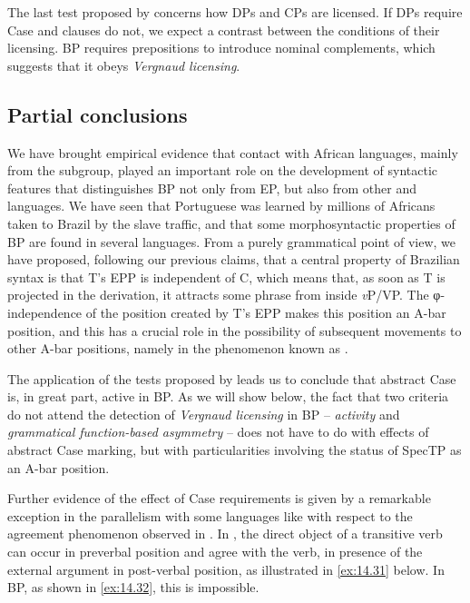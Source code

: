 \documentclass[output=paper]{langsci/langscibook}
\begin{document}
\largerpage

The last test proposed by \citeauthor{SheevanderWal2018} concerns how DPs and
CPs are licensed. If DPs require Case and clauses do not, we expect a contrast
between the conditions of their licensing. \gls{BP} requires prepositions to
introduce nominal complements, which suggests that it obeys \emph{Vergnaud
licensing}.

\subsection{Partial conclusions}\label{sec:14.4.3}\largerpage

We have brought empirical evidence that contact with African languages, mainly
from the  subgroup, played an important role on the development of
syntactic features that distinguishes \gls{BP} not
only from \gls{EP}, but also from other 
and  languages. We have seen that Portuguese was learned by
millions of Africans taken to Brazil by the slave traffic, and that some
morphosyntactic properties of \gls{BP} are found in
several  languages. From a purely grammatical point of view, we have
proposed, following our previous claims, that a central property of Brazilian
syntax is that T’s \gls{EPP} is independent
of C, which means that, as soon as T is projected in the derivation, it
attracts some phrase from inside \emph{v}P/VP. The φ-independence of the
position created by T’s \gls{EPP} makes this
position an A-bar position, and this has a crucial role in the possibility of
subsequent movements to other A-bar positions, namely in the phenomenon known
as .

The application of the tests proposed by \textcite{SheevanderWal2018} leads us
to conclude that abstract Case is, in great part, active in
\gls{BP}. As we will show below, the fact that two
criteria do not attend the detection of \emph{Vergnaud licensing} in
\gls{BP} – \emph{activity} and \emph{grammatical
function-based asymmetry} – does not have to do with effects of abstract Case
marking, but with particularities involving the status of SpecTP as an A-bar
position.

Further evidence of the effect of Case requirements is given by a remarkable
exception in the parallelism with some  languages like  with
respect to the agreement phenomenon observed in . In
, the direct object of a transitive verb can occur in preverbal
position and agree with the verb, in presence of the external argument in
post-verbal position, as illustrated in \eqref{ex:14.31} below. In \gls{BP}, as
shown in \eqref{ex:14.32}, this is impossible.
\end{document}
